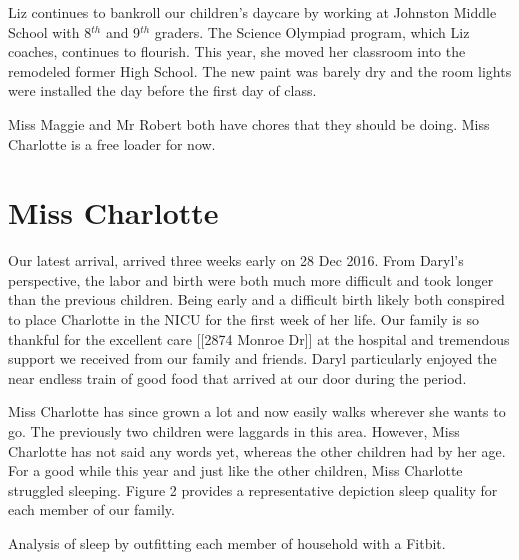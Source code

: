 \documentclass[letterpaper,11pt]{article}
\makeatletter
\newenvironment{figurehere}
  {\def\@captype{figure}}
  {}
\makeatother
\begin{document}
\begin{multicols}{2}
Liz continues to bankroll our children's daycare by working at Johnston
Middle School with 8$^{th}$ and 9$^{th}$ graders.
The Science Olympiad program, which Liz coaches, continues to flourish. 
This year, she moved her classroom into the remodeled former High School.  The
new paint was barely dry and the room lights were installed the day before the
first day of class.

Miss Maggie and Mr Robert both have chores that they should be doing.  Miss
Charlotte is a free loader for now.

\section{Miss Charlotte}

Our latest arrival, arrived three weeks early on 28 Dec 2016.  From Daryl's
perspective, the labor and birth were both much more difficult and took longer
than the previous children.  Being early and a difficult birth likely both
conspired to place Charlotte in the NICU for the first week of her life.  Our
family is so thankful for the excellent care [[2874 Monroe Dr]] at the hospital
and tremendous support we received from our family and friends.  Daryl particularly enjoyed the
near endless train of good food that arrived at our door during the period.

Miss Charlotte has since grown a lot and now easily walks wherever she wants to
go. The previously two children were laggards in this area.  However,
Miss Charlotte has not said any words yet, whereas the other children had by
her age.  For a good while this year and just like the other children, Miss
Charlotte struggled sleeping. Figure 2 provides a representative depiction sleep
quality for each member of our family.

\bigskip

\begin{figurehere}
 \centering   
 \caption{Analysis of sleep by outfitting each member of household with a
 Fitbit.}
\end{figurehere}


\end{multicols}
\end{document}
